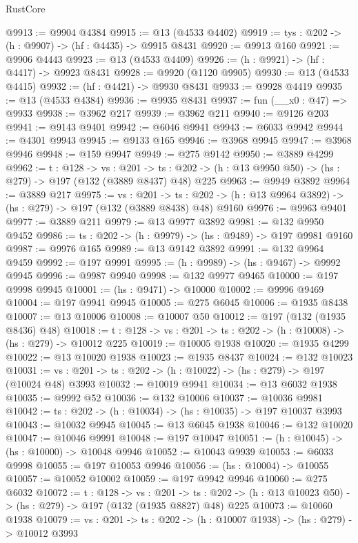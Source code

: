 \begin{lexlean}{RustCore}
\begin{coremodule}
@9913 := @9904 @4384
@9915 := @13 (@4533 @4402)
@9919 := {tys : @202} -> (h : @9907) -> (hf : @4435) -> @9915 @8431
@9920 := @9913 @160
@9921 := @9906 @4443
@9923 := @13 (@4533 @4409)
@9926 := (h : @9921) -> (hf : @4417) -> @9923 @8431
@9928 := @9920 (@1120 @9905)
@9930 := @13 (@4533 @4415)
@9932 := (hf : @4421) -> @9930 @8431
@9933 := @9928 @4419
@9935 := @13 (@4533 @4384)
@9936 := @9935 @8431
@9937 := fun (__x0 : @47) => @9933
@9938 := @3962 @217
@9939 := @3962 @211
@9940 := @9126 @203
@9941 := @9143 @9401
@9942 := @6046 @9941
@9943 := @6033 @9942
@9944 := @4301 @9943
@9945 := @9133 @165
@9946 := @3968 @9945
@9947 := @3968 @9946
@9948 := @159 @9947
@9949 := @275 @9142
@9950 := @3889 @4299
@9962 := {t : @128} ->
  {vs : @201} ->
  {ts : @202} -> (h : @13 @9950 @50) -> (hs : @279) -> @197 (@132 (@3889 @8437) @48) @225
@9963 := @9949 @3892
@9964 := @3889 @217
@9975 := {vs : @201} ->
  {ts : @202} -> (h : @13 @9964 @3892) -> (hs : @279) -> @197 (@132 (@3889 @8438) @48) @9160
@9976 := @9963 @9401
@9977 := @3889 @211
@9979 := @13 @9977 @3892
@9981 := @132 @9950 @9452
@9986 := {ts : @202} -> (h : @9979) -> (hs : @9489) -> @197 @9981 @9160
@9987 := @9976 @165
@9989 := @13 @9142 @3892
@9991 := @132 @9964 @9459
@9992 := @197 @9991
@9995 := (h : @9989) -> (hs : @9467) -> @9992 @9945
@9996 := @9987 @9940
@9998 := @132 @9977 @9465
@10000 := @197 @9998 @9945
@10001 := (hs : @9471) -> @10000
@10002 := @9996 @9469
@10004 := @197 @9941 @9945
@10005 := @275 @6045
@10006 := @1935 @8438
@10007 := @13 @10006
@10008 := @10007 @50
@10012 := @197 (@132 (@1935 @8436) @48)
@10018 := {t : @128} -> {vs : @201} -> {ts : @202} -> (h : @10008) -> (hs : @279) -> @10012 @225
@10019 := @10005 @1938
@10020 := @1935 @4299
@10022 := @13 @10020 @1938
@10023 := @1935 @8437
@10024 := @132 @10023
@10031 := {vs : @201} -> {ts : @202} -> (h : @10022) -> (hs : @279) -> @197 (@10024 @48) @3993
@10032 := @10019 @9941
@10034 := @13 @6032 @1938
@10035 := @9992 @52
@10036 := @132 @10006
@10037 := @10036 @9981
@10042 := {ts : @202} -> (h : @10034) -> (hs : @10035) -> @197 @10037 @3993
@10043 := @10032 @9945
@10045 := @13 @6045 @1938
@10046 := @132 @10020
@10047 := @10046 @9991
@10048 := @197 @10047
@10051 := (h : @10045) -> (hs : @10000) -> @10048 @9946
@10052 := @10043 @9939
@10053 := @6033 @9998
@10055 := @197 @10053 @9946
@10056 := (hs : @10004) -> @10055
@10057 := @10052 @10002
@10059 := @197 @9942 @9946
@10060 := @275 @6032
@10072 := {t : @128} ->
  {vs : @201} ->
  {ts : @202} -> (h : @13 @10023 @50) -> (hs : @279) -> @197 (@132 (@1935 @8827) @48) @225
@10073 := @10060 @1938
@10079 := {vs : @201} -> {ts : @202} -> (h : @10007 @1938) -> (hs : @279) -> @10012 @3993

\end{coremodule}
\end{lexlean}
